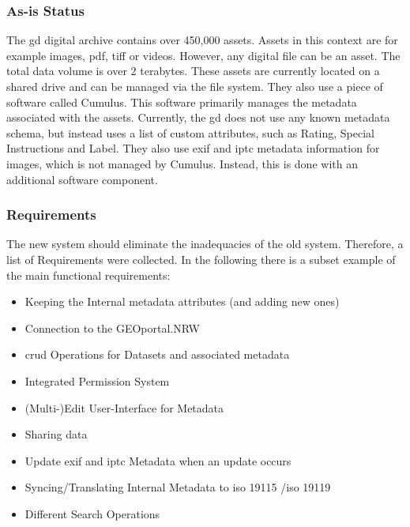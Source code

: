 \documentclass[11pt, titlepage, a4paper]{article}
\begin{document}
\subsubsection{As-is Status}
The \gls{gd} digital archive contains over 450,000 assets. Assets in this context are for example images, \gls{pdf}, \gls{tiff} or videos. However, any digital file can be an asset. The total data volume is over 2 terabytes.
These assets are currently located on a shared drive and can be managed via the file system. They also use a piece of software called Cumulus. This software primarily manages the metadata associated with the assets. Currently, the \gls{gd} does not use any known metadata schema, but instead uses a list of custom attributes, such as Rating, Special Instructions and Label.
They also use \gls{exif} and \gls{iptc} metadata information for images, which is not managed by Cumulus. Instead, this is done with an additional software component. %

\subsubsection{Requirements}
The new system should eliminate the inadequacies of the old system. Therefore, a list of Requirements were collected. In the following there is a subset example of the main functional requirements:
\begin{itemize}
    \item Keeping the Internal metadata attributes (and adding new ones)
    \item Connection to the GEOportal.NRW
    \item \gls{crud} Operations for Datasets and associated metadata
    \item  Integrated Permission System
    \item (Multi-)Edit User-Interface for Metadata
    \item Sharing data
    \item Update \gls{exif} and \gls{iptc} Metadata when an update occurs
    \item Syncing/Translating Internal Metadata to \gls{iso} 19115 \cite{isoISO1911512014}/\gls{iso} 19119 \cite{isoISO191192016}
    \item Different Search Operations
\end{itemize}
\end{document}
